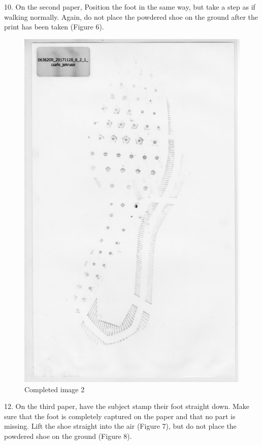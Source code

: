 \newpage

10. On the second paper, Position the foot in the same way, but take a step as if walking normally. Again, do not place the powdered shoe on the ground after the print has been taken (Figure 6). 


\begin{figure}[!htp]
\centering
\includegraphics[scale=0.1]{Baseline_Paper_2}
\caption{Completed image 2}
\label{Image 6}
\end{figure}

12. On the third paper, have the subject stamp their foot straight down. Make sure that the foot is completely captured on the paper and that no part is missing. Lift the shoe straight into the air (Figure 7), but do not place the powdered shoe on the ground (Figure 8).

